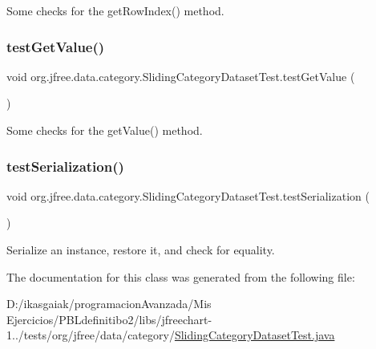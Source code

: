 Some checks for the get\+Row\+Index() method. \mbox{\label{classorg_1_1jfree_1_1data_1_1category_1_1_sliding_category_dataset_test_ab1a842dffd4468864702a879ed0ef2a3}} 
\subsubsection{\texorpdfstring{test\+Get\+Value()}{testGetValue()}}
{\footnotesize\ttfamily void org.\+jfree.\+data.\+category.\+Sliding\+Category\+Dataset\+Test.\+test\+Get\+Value (\begin{DoxyParamCaption}{ }\end{DoxyParamCaption})}

Some checks for the get\+Value() method. \mbox{\label{classorg_1_1jfree_1_1data_1_1category_1_1_sliding_category_dataset_test_ab4c09bd733b65ffd45315390ade7e1ac}} 
\subsubsection{\texorpdfstring{test\+Serialization()}{testSerialization()}}
{\footnotesize\ttfamily void org.\+jfree.\+data.\+category.\+Sliding\+Category\+Dataset\+Test.\+test\+Serialization (\begin{DoxyParamCaption}{ }\end{DoxyParamCaption})}

Serialize an instance, restore it, and check for equality. 

The documentation for this class was generated from the following file\+:\begin{DoxyCompactItemize}
\item 
D\+:/ikasgaiak/programacion\+Avanzada/\+Mis Ejercicios/\+P\+B\+Ldefinitibo2/libs/jfreechart-\/1../tests/org/jfree/data/category/\mbox{\hyperlink{_sliding_category_dataset_test_8java}{Sliding\+Category\+Dataset\+Test.\+java}}\end{DoxyCompactItemize}
